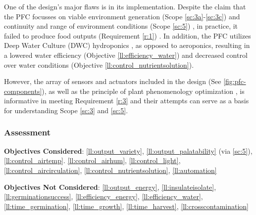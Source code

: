 One of the design's major flaws is in its implementation. Despite the claim that the PFC focusses on viable environment generation (Scope \ref{sc:3a}-\ref{sc:3c}) and continuity and range of environment conditions (Scope \ref{sc:5}) \cite{mit-basil}, in practice, it failed to produce food outputs (Requirement \ref{r:1}) \cite{mit-wfp}.
In addition, the PFC utilizes Deep Water Culture (DWC) hydroponics \cite{mit-pfc}, as opposed to aeroponics, resulting in a lowered water efficiency (Objective \ref{ll:efficiency_water}) and decreased control over water conditions (Objective \ref{ll:control_nutrientsolution}).

However, the array of sensors and actuators included in the design (See \ref{fig:pfc-components}), as well as the principle of plant phenomenology optimization \cite{mit-openag}, is informative in meeting Requirement \ref{r:3} and their attempts can serve as a basis for understanding Scope \ref{sc:3} and \ref{sc:5}.

\subsubsection{Assessment}

\textbf{Objectives Considered}: \ref{ll:output_variety}, \ref{ll:output_palatability} (via \ref{sc:5}), \ref{ll:control_airtemp}. \ref{ll:control_airhum}, \ref{ll:control_light}, \ref{ll:control_aircirculation}, \ref{ll:control_nutrientsolution}, \ref{ll:automation}

\textbf{Objectives Not Considered}: \ref{ll:output_energy}, \ref{ll:insulateisolate}, \ref{ll:germinationsuccess}, \ref{ll:efficiency_energy}, \ref{ll:efficiency_water}, \ref{ll:time_germination}, \ref{ll:time_growth}, \ref{ll:time_harvest}, \ref{ll:crosscontamination}

